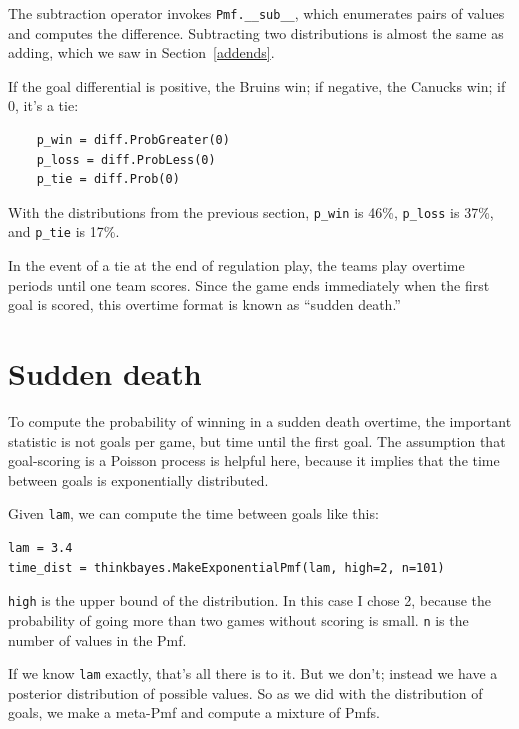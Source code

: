 \documentclass[12pt]{book}
\begin{document}
The subtraction operator invokes \verb"Pmf.__sub__", which enumerates
pairs of values and computes the difference.  Subtracting two
distributions is almost the same as adding, which we saw in
Section~\ref{addends}.

If the goal differential is positive, the Bruins win; if negative, the
Canucks win; if 0, it's a tie:

\begin{verbatim}
    p_win = diff.ProbGreater(0)
    p_loss = diff.ProbLess(0)
    p_tie = diff.Prob(0)
\end{verbatim}  

With the distributions from the previous section, \verb"p_win"
is 46\%, \verb"p_loss" is 37\%, and \verb"p_tie" is 17\%.

In the event of a tie at the end of regulation play, the teams play
overtime periods until one team scores.  Since the game ends
immediately when the first goal is scored, this overtime format
is known as ``sudden death.''


\section{Sudden death}

To compute the probability of winning in a sudden death overtime,
the important statistic is not goals per game, but time until the
first goal.  The assumption that goal-scoring is a Poisson process
is helpful here, because it implies that the time between goals
is exponentially distributed.

Given {\tt lam}, we can compute the time between goals like this: 

\begin{verbatim}
lam = 3.4
time_dist = thinkbayes.MakeExponentialPmf(lam, high=2, n=101)
\end{verbatim}  

{\tt high} is the upper bound of the distribution.  In this case
I chose 2, because the probability of going more than two games
without scoring is small.  {\tt n} is the number of values in
the Pmf.

If we know {\tt lam} exactly, that's all there is to it.
But we don't; instead we have a posterior
distribution of possible values.  So as we did with the distribution
of goals, we make a meta-Pmf and compute a mixture of
Pmfs.
\end{document}
